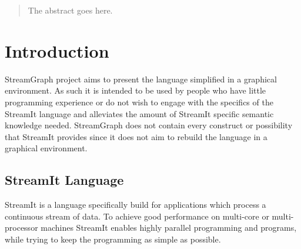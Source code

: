 \documentclass[journal]{IEEEtran}
\begin{document}







\maketitle

\begin{abstract}
The abstract goes here.
\end{abstract}



%



\section{Introduction}
 StreamGraph project aims to present the language
simplified in a graphical environment. As such it is intended to be used by
people who have little programming experience or do not wish to engage with the
specifics of the StreamIt language and alleviates the amount of StreamIt
specific semantic knowledge needed. StreamGraph does not contain every construct
or possibility that StreamIt provides since it does not aim to rebuild the
language in a graphical environment.



\subsection{StreamIt Language}
\noindent StreamIt is a language specifically build for applications which
process a continuous stream of data. To achieve good performance on multi-core
or multi-processor machines StreamIt enables highly parallel programming and
programs, while trying to keep the programming as simple as possible.\\
\end{document}
